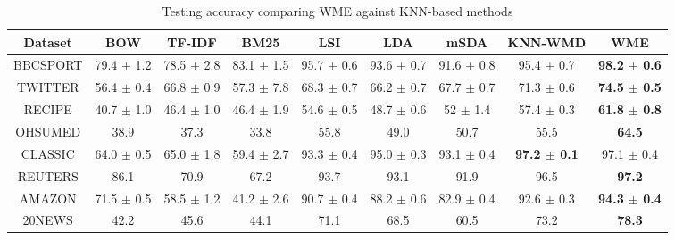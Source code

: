 \documentclass[11pt,a4paper]{article}
\newcommand{\1}{\boldsymbol{1}}
\begin{document}
\begin{table}[h]
\centering
\scriptsize
\caption{Testing accuracy comparing WME against KNN-based methods}
\vspace{-0mm}
\label{tb:comp_knn}
\newcommand{\Bd}[1]{\textbf{#1}}
\begin{center}
    \begin{tabular}{ c c c c c c c c c}
    \hline
    Dataset & BOW & TF-IDF & BM25 & LSI & LDA & mSDA & KNN-WMD & WME \\ \hline 
    BBCSPORT  & 79.4 $\pm$ 1.2 & 78.5 $\pm$ 2.8 & 83.1 $\pm$ 1.5 & 95.7 $\pm$ 0.6 & 93.6 $\pm$ 0.7 & 91.6 $\pm$ 0.8 & 95.4 $\pm$ 0.7 & \Bd{98.2 $\pm$ 0.6} \\ %
    TWITTER	 & 56.4 $\pm$ 0.4 & 66.8 $\pm$ 0.9 & 57.3 $\pm$ 7.8 & 68.3 $\pm$ 0.7 & 66.2 $\pm$ 0.7 & 67.7 $\pm$ 0.7 & 71.3 $\pm$ 0.6 & \Bd{74.5 $\pm$ 0.5} \\ %
    RECIPE	& 40.7 $\pm$ 1.0 & 46.4 $\pm$ 1.0 & 46.4 $\pm$ 1.9 & 54.6 $\pm$ 0.5 & 48.7 $\pm$ 0.6 & 52 $\pm$ 1.4 & 57.4 $\pm$ 0.3 & \Bd{61.8 $\pm$ 0.8} \\ %
    OHSUMED  & 38.9 & 37.3 & 33.8 & 55.8 & 49.0 & 50.7 & 55.5 & \Bd{64.5} \\ %
    CLASSIC  & 64.0 $\pm$ 0.5 & 65.0 $\pm$ 1.8 & 59.4 $\pm$ 2.7 & 93.3 $\pm$ 0.4 & 95.0 $\pm$ 0.3 & 93.1 $\pm$ 0.4 & \Bd{97.2 $\pm$ 0.1} & 97.1 $\pm$ 0.4 \\ %
    REUTERS  & 86.1 & 70.9 & 67.2 & 93.7 & 93.1 & 91.9 & 96.5 & \Bd{97.2} \\ %
    AMAZON  & 71.5 $\pm$ 0.5 & 58.5 $\pm$ 1.2 & 41.2 $\pm$ 2.6 & 90.7 $\pm$ 0.4 & 88.2 $\pm$ 0.6 & 82.9 $\pm$ 0.4 & 92.6 $\pm$ 0.3 & \Bd{94.3 $\pm$ 0.4} \\ %
    20NEWS  & 42.2 & 45.6 & 44.1 & 71.1 & 68.5 & 60.5 & 73.2 & \Bd{78.3}  \\ \hline
    \end{tabular}
\end{center}
\vspace{0mm}
\end{table}
\end{document}
